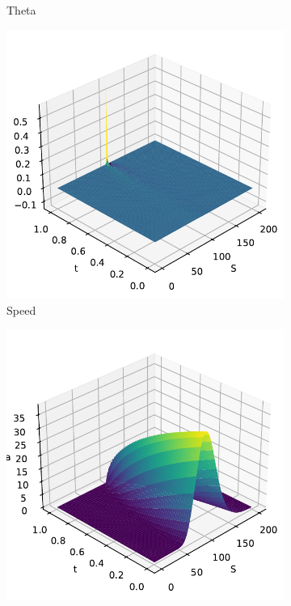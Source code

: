 \begin{figure}[H]
\begin{subfigure}[b]{0.3\linewidth}
        \caption{Theta}
    \end{subfigure}
    \begin{subfigure}[b]{0.3\linewidth}
        \includegraphics[width=\linewidth]{Imagenes/Parte1/6_Sols/Put/Put_Speed.pdf}
        \caption{Speed}
    \end{subfigure}
    \begin{subfigure}[b]{0.3\linewidth}
        \includegraphics[width=\linewidth]{Imagenes/Parte1/6_Sols/Put/Put_Vega.pdf}

\end{subfigure}
\end{figure}
